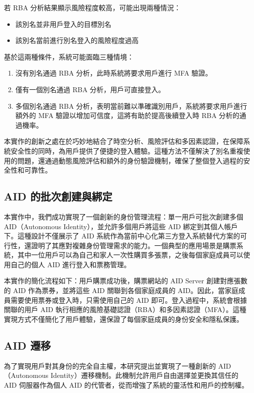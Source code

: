 若 RBA 分析結果顯示風險程度較高，可能出現兩種情況：
\begin{itemize}
  \item 該別名並非用戶登入的目標別名
  \item 該別名當前進行別名登入的風險程度過高
\end{itemize}

基於這兩種條件，系統可能面臨三種情境：
\begin{enumerate}
  \item 沒有別名通過 RBA 分析，此時系統將要求用戶進行 MFA 驗證。
  \item 僅有一個別名通過 RBA 分析，用戶可直接登入。
  \item 多個別名通過 RBA 分析，表明當前難以準確識別用戶，系統將要求用戶進行額外的 MFA 驗證以增加可信度，這將有助於提高後續登入時 RBA 分析的通過機率。
\end{enumerate}

本實作的創新之處在於巧妙地結合了時空分析、風險評估和多因素認證，在保障系統安全性的同時，為用戶提供了便捷的登入體驗。這種方法不僅解決了別名重複使用的問題，還通過動態風險評估和額外的身份驗證機制，確保了整個登入過程的安全性和可靠性。

\subsection{AID 的批次創建與綁定}

本實作中，我們成功實現了一個創新的身份管理流程：單一用戶可批次創建多個 AID（Autonomous Identity），並允許多個用戶將這些 AID 綁定到其個人帳戶下。這種設計不僅展示了 AID 系統作為當前中心化第三方登入系統替代方案的可行性，還證明了其應對複雜身份管理需求的能力。一個典型的應用場景是購票系統，其中一位用戶可以為自己和家人一次性購買多張票，之後每個家庭成員可以使用自己的個人 AID 進行登入和票務管理。

本實作的簡化流程如下：用戶購票成功後，購票網站的 AID Server 創建對應張數的 AID 作為票券，並將這些 AID 關聯到各個家庭成員的 AID。因此，當家庭成員需要使用票券或登入時，只需使用自己的 AID 即可。登入過程中，系統會根據關聯的用戶 AID 執行相應的風險基礎認證（RBA）和多因素認證（MFA）。這種實現方式不僅簡化了用戶體驗，還保證了每個家庭成員的身份安全和隱私保護。

\subsection{AID 遷移}

為了實現用戶對其身份的完全自主權，本研究提出並實現了一種創新的 AID（Autonomous Identity）遷移機制。此機制允許用戶自由選擇並更換其信任的 AID 伺服器作為個人 AID 的代管者，從而增強了系統的靈活性和用戶的控制權。

